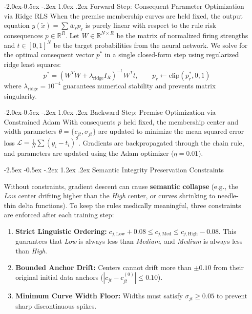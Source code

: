 \documentclass[12pt,a4paper,oneside]{report}
\makeatletter
\renewcommand\section{\@startsection {section}{1}{\z@}%
                                   {-2.5ex \@plus -0.5ex \@minus -.2ex}%
                                   {1.2ex \@plus .2ex}%
                                   {\normalfont\fontsize{13}{16}\selectfont\bfseries}}
\renewcommand\subsection{\@startsection{subsection}{2}{\z@}%
                                     {-2.0ex\@plus -0.5ex \@minus -.2ex}%
                                     {1.0ex \@plus .2ex}%
                                     {\normalfont\fontsize{12}{15}\selectfont\bfseries}}
\makeatother
\begin{document}
\subsection{Forward Step: Consequent Parameter Optimization via Ridge RLS}
When the premise membership curves are held fixed, the output equation $y(\tilde{x}) = \sum \bar{w}_r p_r$ is purely linear with respect to the rule risk consequences $p \in \mathbb{R}^R$. Let $W \in \mathbb{R}^{N \times R}$ be the matrix of normalized firing strengths and $t \in [0, 1]^N$ be the target probabilities from the neural network. We solve for the optimal consequent vector $p^*$ in a single closed-form step using regularized ridge least squares:
\begin{equation}
    p^* = \left( W^T W + \lambda_{\text{ridge}} I_R \right)^{-1} W^T t, \qquad p_r \leftarrow \text{clip}(p_r^*, 0, 1)
\end{equation}
where $\lambda_{\text{ridge}} = 10^{-4}$ guarantees numerical stability and prevents matrix singularity.

\subsection{Backward Step: Premise Optimization via Constrained Adam}
With consequents $p$ held fixed, the membership center and width parameters $\theta = \{c_{jt}, \sigma_{jt}\}$ are updated to minimize the mean squared error loss $\mathcal{L} = \frac{1}{N} \sum (y_i - t_i)^2$. Gradients are backpropagated through the chain rule, and parameters are updated using the Adam optimizer ($\eta = 0.01$).

\section{Semantic Integrity Preservation Constraints}

Without constraints, gradient descent can cause \textbf{semantic collapse} (e.g., the \textit{Low} center drifting higher than the \textit{High} center, or curves shrinking to needle-thin delta functions). To keep the rules medically meaningful, three constraints are enforced after each training step:
\begin{enumerate}
    \setlength{\itemsep}{0pt}
    \setlength{\parskip}{0pt}
    \item \textbf{Strict Linguistic Ordering:} $c_{j, \text{Low}} + 0.08 \le c_{j, \text{Med}} \le c_{j, \text{High}} - 0.08$. This guarantees that \textit{Low} is always less than \textit{Medium}, and \textit{Medium} is always less than \textit{High}.
    \item \textbf{Bounded Anchor Drift:} Centers cannot drift more than $\pm 0.10$ from their original initial data anchors ($|c_{jt} - c_{jt}^{(0)}| \le 0.10$).
    \item \textbf{Minimum Curve Width Floor:} Widths must satisfy $\sigma_{jt} \ge 0.05$ to prevent sharp discontinuous spikes.
\end{enumerate}
\end{document}

